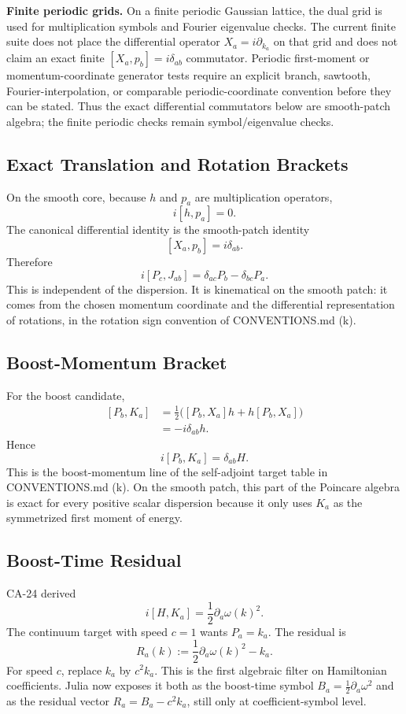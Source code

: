\textbf{Finite periodic grids.}  On a finite periodic Gaussian lattice, the
dual grid is used for multiplication symbols and Fourier eigenvalue checks.
The current finite suite does not place the differential operator
\(X_a=i\partial_{k_a}\) on that grid and does not claim an exact finite
\([X_a,p_b]=i\delta_{ab}\) commutator.  Periodic first-moment or
momentum-coordinate generator tests require an explicit branch, sawtooth,
Fourier-interpolation, or comparable periodic-coordinate convention before
they can be stated.  Thus the exact differential commutators below are
smooth-patch algebra; the finite periodic checks remain symbol/eigenvalue
checks.

\subsection{Exact Translation and Rotation Brackets}

On the smooth core, because \(h\) and \(p_a\) are multiplication operators,
\[
  i[h,p_a]=0.
\]
The canonical differential identity is the smooth-patch identity
\[
  [X_a,p_b]=i\delta_{ab}.
\]
Therefore
\[
  i[P_c,J_{ab}]
  =
  \delta_{ac}P_b-\delta_{bc}P_a.
\]
This is independent of the dispersion.  It is kinematical on the smooth patch:
it comes from the chosen momentum coordinate and the differential
representation of rotations, in the rotation sign convention of
CONVENTIONS.md (k).

\subsection{Boost-Momentum Bracket}

For the boost candidate,
\[
\begin{aligned}
  [P_b,K_a]
  &=
  \frac{1}{2}\bigl([P_b,X_a]h+h[P_b,X_a]\bigr)\\
  &=
  -i\delta_{ab}h.
\end{aligned}
\]
Hence
\[
  i[P_b,K_a]=\delta_{ab}H .
\]
This is the boost-momentum line of the self-adjoint target table in
CONVENTIONS.md (k).
On the smooth patch, this part of the Poincare algebra is exact for every
positive scalar dispersion because it only uses \(K_a\) as the symmetrized first
moment of energy.

\subsection{Boost-Time Residual}

CA-24 derived
\[
  i[H,K_a]
  =
  \frac{1}{2}\partial_a\omega(k)^2.
\]
The continuum target with speed \(c=1\) wants \(P_a=k_a\).  The residual is
\[
  R_a(k)
  :=
  \frac{1}{2}\partial_a\omega(k)^2-k_a.
\]
For speed \(c\), replace \(k_a\) by \(c^2k_a\).  This is the first algebraic
filter on Hamiltonian coefficients.  Julia now exposes it both as the
boost-time symbol \(B_a=\frac12\partial_a\omega^2\) and as the residual vector
\(R_a=B_a-c^2k_a\), still only at coefficient-symbol level.


